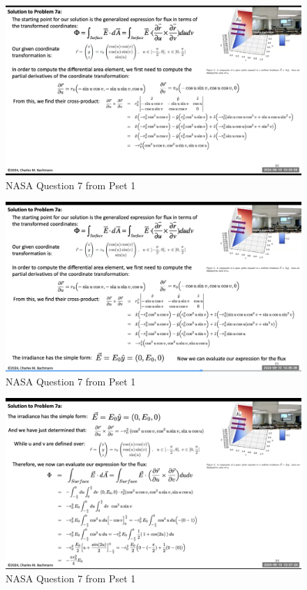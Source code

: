 \documentclass{article}
\begin{document}
\begin{figure}[h!]
\centering
\includegraphics[scale=.4]{Radiometry/Crux/Num2.png}
\caption{NASA Question 7 from Pset 1}
\label{fig:NASA Question}
\end{figure}


\begin{figure}[h!]
\centering
\includegraphics[scale=.4]{Radiometry/Crux/Num3.png}
\caption{NASA Question 7 from Pset 1}
\label{fig:NASA Question}
\end{figure}

\begin{figure}[h!]
\centering
\includegraphics[scale=.4]{Radiometry/Crux/Num4.png}
\caption{NASA Question 7 from Pset 1}
\label{fig:NASA Question}
\end{figure}
\end{document}
